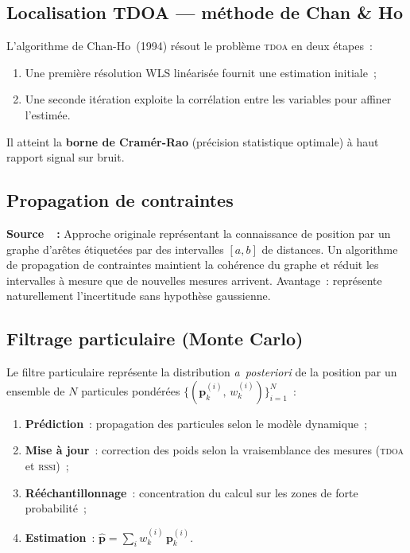 \documentclass[12pt, a4paper]{article}
\newcommand{\TDOA}{\textsc{tdoa}}
\newcommand{\RSSI}{\textsc{rssi}}
\begin{document}
\subsection{Localisation TDOA — méthode de Chan \& Ho}

L'algorithme de Chan-Ho~(1994) résout le problème \TDOA{} en deux étapes~:
\begin{enumerate}
  \item Une première résolution WLS linéarisée fournit une estimation initiale~;
  \item Une seconde itération exploite la corrélation entre les variables pour
        affiner l'estimée.
\end{enumerate}
Il atteint la \textbf{borne de Cramér-Rao} (précision statistique optimale) à
haut rapport signal sur bruit.

\subsection{Propagation de contraintes}

\begin{citebox}
\textbf{Source~\cite{Bischoff2006}~:} Approche originale représentant la
connaissance de position par un graphe d'arêtes étiquetées par des intervalles
$[a, b]$ de distances. Un algorithme de propagation de contraintes maintient la
cohérence du graphe et réduit les intervalles à mesure que de nouvelles mesures
arrivent. Avantage~: représente naturellement l'incertitude sans hypothèse gaussienne.
\end{citebox}

\subsection{Filtrage particulaire (Monte Carlo)}

Le filtre particulaire représente la distribution \textit{a~posteriori} de la
position par un ensemble de $N$ particules pondérées
$\{(\mathbf{p}_k^{(i)},\, w_k^{(i)})\}_{i=1}^{N}$~:

\begin{enumerate}
  \item \textbf{Prédiction}~: propagation des particules selon le modèle dynamique~;
  \item \textbf{Mise à jour}~: correction des poids selon la vraisemblance des mesures
        (\TDOA{} et \RSSI{})~;
  \item \textbf{Rééchantillonnage}~: concentration du calcul sur les zones de forte
        probabilité~;
  \item \textbf{Estimation}~: $\hat{\mathbf{p}} = \sum_i w_k^{(i)}\,\mathbf{p}_k^{(i)}$.
\end{enumerate}
\end{document}
